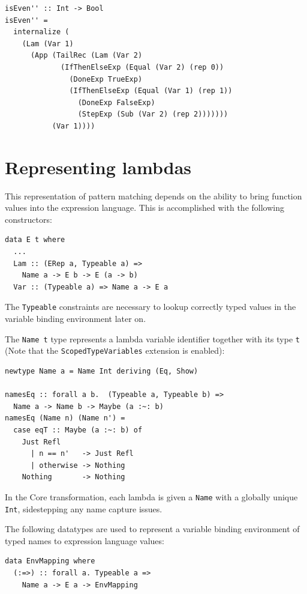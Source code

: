 \documentclass[runningheads, a4paper]{llncs}
\newcommand{\ttt}{\texttt}
\begin{document}

\begin{lstlisting}
isEven'' :: Int -> Bool
isEven'' =
  internalize (
    (Lam (Var 1)
      (App (TailRec (Lam (Var 2)
             (IfThenElseExp (Equal (Var 2) (rep 0))
               (DoneExp TrueExp)
               (IfThenElseExp (Equal (Var 1) (rep 1))
                 (DoneExp FalseExp)
                 (StepExp (Sub (Var 2) (rep 2)))))))
           (Var 1))))
\end{lstlisting}

\section{Representing lambdas}
\label{sec:LamRep}

This representation of pattern matching depends on the ability to bring
function values into the expression language. This is accomplished
with the following constructors:

\begin{lstlisting}
data E t where
  ...
  Lam :: (ERep a, Typeable a) =>
    Name a -> E b -> E (a -> b)
  Var :: (Typeable a) => Name a -> E a
\end{lstlisting}

The \ttt{Typeable} constraints are necessary to lookup correctly typed
values in the variable binding environment later on.

The \ttt{Name t} type represents a lambda variable identifier together with its
type \ttt{t} (Note that the \ttt{ScopedTypeVariables} extension is enabled):

\begin{lstlisting}
newtype Name a = Name Int deriving (Eq, Show)

namesEq :: forall a b.  (Typeable a, Typeable b) =>
  Name a -> Name b -> Maybe (a :~: b)
namesEq (Name n) (Name n') =
  case eqT :: Maybe (a :~: b) of
    Just Refl
      | n == n'   -> Just Refl
      | otherwise -> Nothing
    Nothing       -> Nothing
\end{lstlisting}

In the Core transformation, each lambda is given a \ttt{Name} with a globally
unique \ttt{Int}, sidestepping any name capture issues.

The following datatypes are used to represent a variable binding environment
of typed names to expression language values:

\begin{lstlisting}
data EnvMapping where
  (:=>) :: forall a. Typeable a =>
    Name a -> E a -> EnvMapping
\end{lstlisting}
\end{document}
